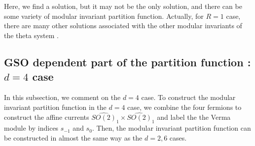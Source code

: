 \documentclass[a4paper,12pt]{article}
\numberwithin{equation}{section}
\begin{document}
Here, we find a solution, but it may not be the only solution, and
there can be some variety of modular invariant partition function.
Actually, for $R=1$ case, there are many other solutions
associated with the other modular invariants of the theta system
\cite{ES0002}.

\subsection{GSO dependent part of the partition function : $d=4$ case}

In this subsection, we comment on the $d=4$ case.
To construct the modular invariant partition function in
the $d=4$ case, we combine the four fermions to
construct the affine currents
$\widehat{SO(2)}_1\times \widehat{SO(2)}_1$ and
label the the Verma module by indices $s_{-1}$ and $s_0$.
Then, the modular invariant partition function can be 
constructed in almost the same way as the $d=2,6$ cases.
\end{document}

